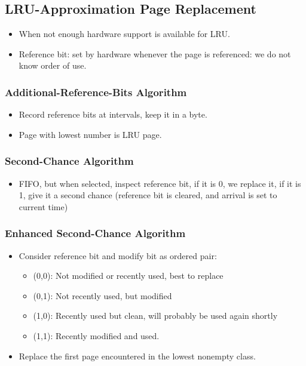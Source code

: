\documentclass[10pt]{report}
\begin{document}
		\subsection{LRU-Approximation Page Replacement}
			\begin{itemize}
				\item When not enough hardware support is available for LRU.
				\item Reference bit: set by hardware whenever the page is referenced: we do not know order of use.
			\end{itemize}

			\subsubsection{Additional-Reference-Bits Algorithm}
				\begin{itemize}
					\item Record reference bits at intervals, keep it in a byte.
					\item Page with lowest number is LRU page.
				\end{itemize}

			\subsubsection{Second-Chance Algorithm}
				\begin{itemize}
					\item FIFO, but when selected, inspect reference bit, if it is 0, we replace it, if it is 1, give it a second chance (reference bit is cleared, and arrival is set to current time)
				\end{itemize}

			\subsubsection{Enhanced Second-Chance Algorithm}
				\begin{itemize}
					\item Consider reference bit and modify bit as ordered pair:
					\begin{itemize}
						\item (0,0): Not modified or recently used, best to replace
						\item (0,1): Not recently used, but modified
						\item (1,0): Recently used but clean, will probably be used again shortly
						\item (1,1): Recently modified and used.
					\end{itemize}
					\item Replace the first page encountered in the lowest nonempty class.
				\end{itemize}
\end{document}
